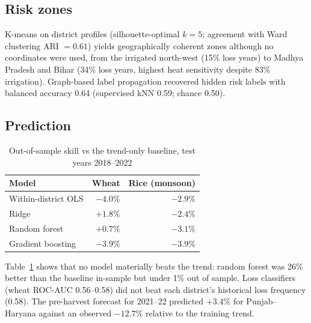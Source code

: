 \documentclass[conference]{IEEEtran}
\begin{document}
\subsection{Risk zones}
K-means on district profiles (silhouette-optimal $k=5$; agreement with Ward clustering ARI $=0.61$) yields
geographically coherent zones although no coordinates were used, from the irrigated north-west (15\% loss years) to
Madhya Pradesh and Bihar (34\% loss years, highest heat sensitivity despite 83\% irrigation). Graph-based label
propagation recovered hidden risk labels with balanced accuracy 0.64 (supervised kNN 0.59; chance 0.50).

\subsection{Prediction}
\begin{table}[t]
\caption{Out-of-sample skill vs the trend-only baseline, test years 2018--2022}
\label{tab:skill}
\centering
\begin{tabular}{lrr}
\toprule
Model & Wheat & Rice (monsoon) \\
\midrule
Within-district OLS & $-4.0\%$ & $-2.9\%$ \\
Ridge & $+1.8\%$ & $-2.4\%$ \\
Random forest & $+0.7\%$ & $-3.1\%$ \\
Gradient boosting & $-3.9\%$ & $-3.9\%$ \\
\bottomrule
\end{tabular}
\end{table}
Table~\ref{tab:skill} shows that no model materially beats the trend: random forest was 26\% better than the baseline
in-sample but under 1\% out of sample. Loss classifiers (wheat ROC-AUC 0.56--0.58) did not beat each district's
historical loss frequency (0.58). The pre-harvest forecast for 2021--22 predicted $+3.4\%$ for Punjab--Haryana against
an observed $-12.7\%$ relative to the training trend.
\end{document}

